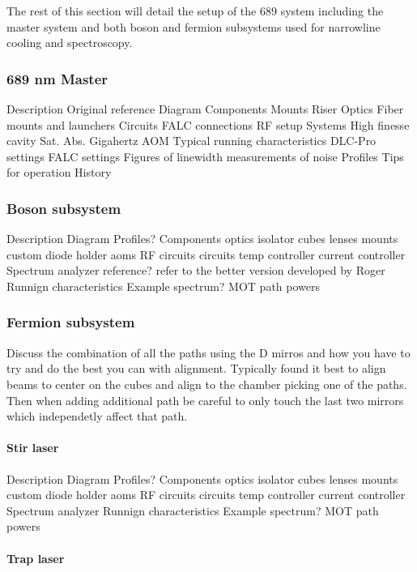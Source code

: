 The rest of this section will detail the setup of the 689 system including the master system and both boson and fermion subsystems used for narrowline cooling and spectroscopy.
	
\subsubsection{689 nm Master}

Description
	Original reference
Diagram
Components
	Mounts
		Riser
	Optics
		Fiber mounts and launchers
	Circuits
		FALC connections
		RF setup
	Systems
		High finesse cavity
		Sat. Abs. 
		Gigahertz AOM
Typical running characteristics
	DLC-Pro settings
	FALC settings
		Figures of linewidth
		measurements of noise
Profiles
Tips for operation
History

\subsubsection{Boson subsystem}

Description
Diagram
	Profiles?
Components
	optics
		isolator
		cubes
		lenses
	mounts
		custom diode holder
	aoms
		RF circuits
	circuits
		temp controller
		current controller
	Spectrum analyzer
		reference?
		refer to the better version developed by Roger
Runnign characteristics
	Example spectrum?
	MOT path powers


\subsubsection{Fermion subsystem}

Discuss the combination of all the paths using the D mirros and how you have to try and do the best you can with alignment. Typically found it best to align beams to center on the cubes and align to the chamber picking one of the paths. Then when adding additional path be careful to only touch the last two mirrors which independetly affect that path.

\paragraph{Stir laser}

Description
Diagram
	Profiles?
Components
	optics
		isolator
		cubes
		lenses
	mounts
		custom diode holder
	aoms
		RF circuits
	circuits
		temp controller
		current controller
	Spectrum analyzer
Runnign characteristics
	Example spectrum?
	MOT path powers

\paragraph{Trap laser}

